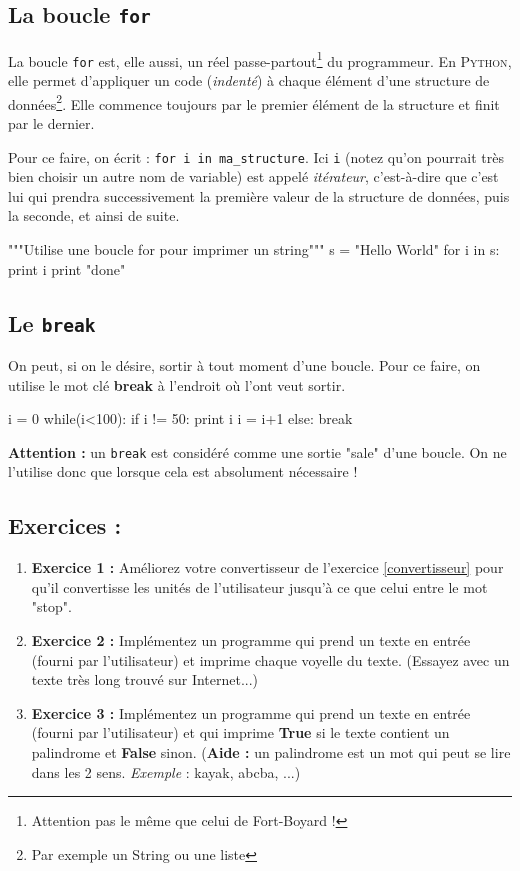 \subsection{La boucle \texttt{for}}

La boucle \texttt{for} est, elle aussi, un réel passe-partout\footnote{Attention pas le même que celui de Fort-Boyard !} du programmeur. En \textsc{Python}, elle permet d'appliquer un code (\textit{indenté}) à chaque élément d'une structure de données\footnote{Par exemple un String ou une liste}. Elle commence toujours par le premier élément de la structure et finit par le dernier.

Pour ce faire, on écrit : \lstinline{for i in ma_structure}. Ici \texttt{i} (notez qu'on pourrait très bien choisir un autre nom de variable) est appelé \textit{itérateur}, c'est-à-dire que c'est lui qui prendra successivement la première valeur de la structure de données, puis la seconde, et ainsi de suite.

\begin{python}[caption = la boucle for]
"""Utilise une boucle for pour imprimer un string"""
s = "Hello World"
for i in s:
	print i
print "done" 
\end{python}

\subsection{Le \texttt{break}}
On peut, si on le désire, sortir à tout moment d'une boucle. Pour ce faire, on utilise le mot clé \textbf{break} à l'endroit où l'ont veut sortir. 

\begin{python}
i = 0
while(i<100):
	if i != 50:
		print i
		i = i+1
	else:
		break
\end{python}

\textbf{Attention : } un \texttt{break} est considéré comme une sortie "sale" d'une boucle. On ne l'utilise donc que lorsque cela est absolument nécessaire !

\subsection{Exercices : }
\begin{enumerate}
\item \textbf{Exercice 1 : } Améliorez votre convertisseur de l'exercice \ref{convertisseur} pour qu'il convertisse les unités de l'utilisateur jusqu'à ce que celui entre le mot "stop".  

\item \textbf{Exercice 2 : } Implémentez un programme qui prend un texte en entrée (fourni par l'utilisateur) et imprime chaque voyelle du texte. (Essayez avec un texte très long trouvé sur Internet...)

\item \textbf{Exercice 3 : } Implémentez un programme qui prend un texte en entrée (fourni par l'utilisateur) et qui imprime \textbf{True} si le texte contient un palindrome et \textbf{False} sinon. (\textbf{Aide :} un palindrome est un mot qui peut se lire dans les 2 sens. \textit{Exemple} : kayak, abcba, ...)
\end{enumerate}